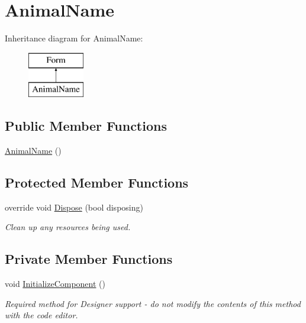 \hypertarget{classWildlifeTrackingApp_1_1AnimalName}{}\section{Animal\+Name}
\label{classWildlifeTrackingApp_1_1AnimalName}
Inheritance diagram for Animal\+Name\+:\begin{figure}[H]
\begin{center}
\leavevmode
\includegraphics[height=2.000000cm]{classWildlifeTrackingApp_1_1AnimalName}
\end{center}
\end{figure}
\subsection*{Public Member Functions}
\begin{DoxyCompactItemize}
\item 
\hyperlink{classWildlifeTrackingApp_1_1AnimalName_a77c9c1ee4d566c59e85c75f4382ccb39}{Animal\+Name} ()
\end{DoxyCompactItemize}
\subsection*{Protected Member Functions}
\begin{DoxyCompactItemize}
\item 
override void \hyperlink{classWildlifeTrackingApp_1_1AnimalName_a849c3c7f8d08104f0cdb46bee9fe6389}{Dispose} (bool disposing)
\begin{DoxyCompactList}\small\item\em Clean up any resources being used. \end{DoxyCompactList}\end{DoxyCompactItemize}
\subsection*{Private Member Functions}
\begin{DoxyCompactItemize}
\item 
void \hyperlink{classWildlifeTrackingApp_1_1AnimalName_a6405d5db675d5338663195a4d12b4c9f}{Initialize\+Component} ()
\begin{DoxyCompactList}\small\item\em Required method for Designer support -\/ do not modify the contents of this method with the code editor. \end{DoxyCompactList}\end{DoxyCompactItemize}
